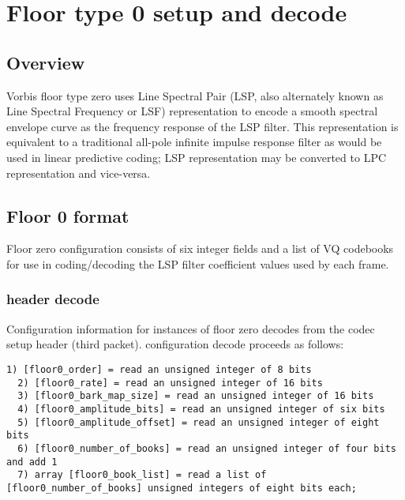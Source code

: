 \section{Floor type 0 setup and decode} \label{vorbis:spec:floor0}

\subsection{Overview}

Vorbis floor type zero uses Line Spectral Pair (LSP, also alternately
known as Line Spectral Frequency or LSF) representation to encode a
smooth spectral envelope curve as the frequency response of the LSP
filter.  This representation is equivalent to a traditional all-pole
infinite impulse response filter as would be used in linear predictive
coding; LSP representation may be converted to LPC representation and
vice-versa.



\subsection{Floor 0 format}

Floor zero configuration consists of six integer fields and a list of
VQ codebooks for use in coding/decoding the LSP filter coefficient
values used by each frame.

\subsubsection{header decode}

Configuration information for instances of floor zero decodes from the
codec setup header (third packet).  configuration decode proceeds as
follows:

\begin{Verbatim}[commandchars=\\\{\}]
  1) [floor0_order] = read an unsigned integer of 8 bits
  2) [floor0_rate] = read an unsigned integer of 16 bits
  3) [floor0_bark_map_size] = read an unsigned integer of 16 bits
  4) [floor0_amplitude_bits] = read an unsigned integer of six bits
  5) [floor0_amplitude_offset] = read an unsigned integer of eight bits
  6) [floor0_number_of_books] = read an unsigned integer of four bits and add 1
  7) array [floor0_book_list] = read a list of [floor0_number_of_books] unsigned integers of eight bits each;
\end{Verbatim}

